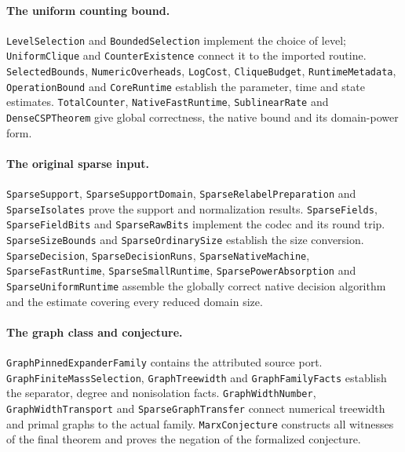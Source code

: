 \documentclass[11pt,reqno]{amsart}
\numberwithin{equation}{section}
\theoremstyle{definition}
\theoremstyle{remark}
\begin{document}
\paragraph{The uniform counting bound.}
\texttt{LevelSelection} and \texttt{BoundedSelection} implement the choice of level; \texttt{UniformClique} and \texttt{CounterExistence} connect it to the imported routine. \texttt{SelectedBounds}, \texttt{NumericOverheads}, \texttt{LogCost}, \texttt{CliqueBudget}, \texttt{RuntimeMetadata}, \texttt{OperationBound} and \texttt{CoreRuntime} establish the parameter, time and state estimates. \texttt{TotalCounter}, \texttt{NativeFastRuntime}, \texttt{SublinearRate} and \texttt{DenseCSPTheorem} give global correctness, the native bound and its domain-power form.

\paragraph{The original sparse input.}
\texttt{SparseSupport}, \texttt{SparseSupportDomain}, \texttt{SparseRelabelPreparation} and \texttt{SparseIsolates} prove the support and normalization results. \texttt{SparseFields}, \texttt{SparseFieldBits} and \texttt{SparseRawBits} implement the codec and its round trip. \texttt{SparseSizeBounds} and \texttt{SparseOrdinarySize} establish the size conversion. \texttt{SparseDecision}, \texttt{SparseDecisionRuns}, \texttt{SparseNativeMachine}, \texttt{SparseFastRuntime}, \texttt{SparseSmallRuntime}, \texttt{SparsePowerAbsorption} and \texttt{SparseUniformRuntime} assemble the globally correct native decision algorithm and the estimate covering every reduced domain size.

\paragraph{The graph class and conjecture.}
\texttt{GraphPinnedExpanderFamily} contains the attributed source port. \texttt{GraphFiniteMassSelection}, \texttt{GraphTreewidth} and \texttt{GraphFamilyFacts} establish the separator, degree and nonisolation facts. \texttt{GraphWidthNumber}, \texttt{GraphWidthTransport} and \texttt{SparseGraphTransfer} connect numerical treewidth and primal graphs to the actual family. \texttt{MarxConjecture} constructs all witnesses of the final theorem and proves the negation of the formalized conjecture.

\par\endgroup
\end{document}
